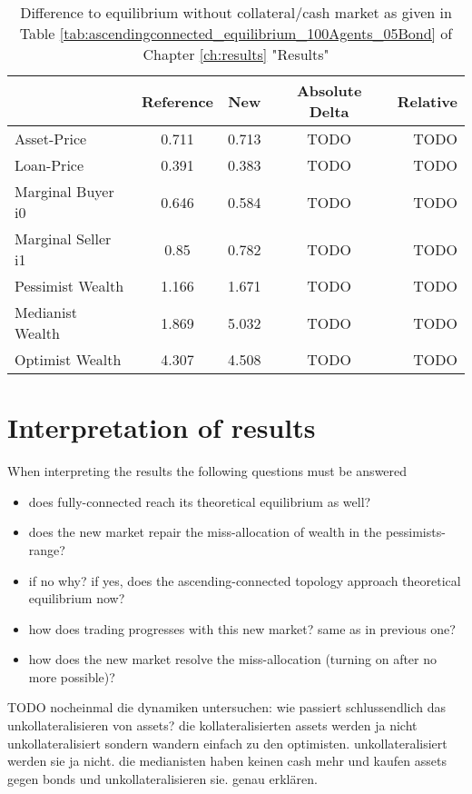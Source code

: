 \documentclass[Bachelorarbeit.tex]{subfiles}
\begin{document}
\begin{table}[h]
	\caption{Difference to equilibrium without collateral/cash market as given in Table \ref{tab:ascendingconnected_equilibrium_100Agents_05Bond} of Chapter \ref{ch:results} "Results"}
	\centering
	\begin{tabular} { l c c c r }
		& Reference & New & Absolute Delta & Relative \\
		\hline
		Asset-Price & 0.711 & 0.713 & TODO & TODO \\
		Loan-Price & 0.391 & 0.383  & TODO & TODO \\
		Marginal Buyer i0 & 0.646 & 0.584 & TODO & TODO \\
		Marginal Seller i1 & 0.85 & 0.782 & TODO & TODO \\
		\hline
		Pessimist Wealth & 1.166 & 1.671  & TODO & TODO \\
		Medianist Wealth & 1.869 & 5.032 & TODO & TODO \\
		Optimist Wealth & 4.307 & 4.508 & TODO & TODO \\
		\hline
	\end{tabular}
\end{table} 

\section{Interpretation of results}
When interpreting the results the following questions must be answered

\begin{itemize}
\item does fully-connected reach its theoretical equilibrium as well?
\item does the new market repair the miss-allocation of wealth in the pessimists-range?
\item if no why? if yes, does the ascending-connected topology approach theoretical equilibrium now?
\item how does trading progresses with this new market? same as in previous one?
\item how does the new market resolve the miss-allocation (turning on after no more possible)?
\end{itemize}

TODO nocheinmal die dynamiken untersuchen: wie passiert schlussendlich das unkollateralisieren von assets? die kollateralisierten assets werden ja nicht unkollateralisiert sondern wandern einfach zu den optimisten. unkollateralisiert werden sie ja nicht. die medianisten haben keinen cash mehr und kaufen assets gegen bonds und unkollateralisieren sie. genau erklären.
\end{document}
